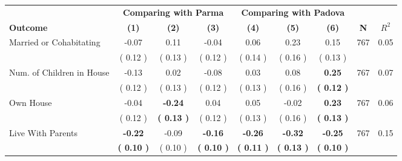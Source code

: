 \begin{tabular}{lcccccccc}
\toprule
 & \multicolumn{3}{c}{\textbf{Comparing with Parma}} & \multicolumn{3}{c}{\textbf{Comparing with Padova}} & \\
\cmidrule(lr){2-4} \cmidrule(lr){5-7} 
 \textbf{Outcome} & \textbf{(1)} & \textbf{(2)} & \textbf{(3)} & \textbf{(4)} & \textbf{(5)} & \textbf{(6)} & \textbf{N} & \textbf{$ R^2$} \\
\midrule
Married or Cohabitating &     -0.07 &      0.11 &     -0.04 &      0.06 &      0.23 &      0.15 & 767 &       0.05 \\ 
 & (     0.12 ) & (     0.13 ) & (     0.12 ) & (     0.14 ) & (     0.16 ) & (     0.13 ) & \\
Num. of Children in House &     -0.13 &      0.02 &     -0.08 &      0.03 &      0.08 & \textbf{     0.25} & 767 &       0.07 \\ 
 & (     0.12 ) & (     0.13 ) & (     0.12 ) & (     0.13 ) & (     0.16 ) & \textbf{(     0.12 )} & \\
Own House &     -0.04 & \textbf{    -0.24} &      0.04 &      0.05 &     -0.02 & \textbf{     0.23} & 767 &       0.06 \\ 
 & (     0.12 ) & \textbf{(     0.13 )} & (     0.12 ) & (     0.13 ) & (     0.16 ) & \textbf{(     0.13 )} & \\
Live With Parents & \textbf{    -0.22} &     -0.09 & \textbf{    -0.16} & \textbf{    -0.26} & \textbf{    -0.32} & \textbf{    -0.25} & 767 &       0.15 \\ 
 & \textbf{(     0.10 )} & (     0.10 ) & \textbf{(     0.10 )} & \textbf{(     0.11 )} & \textbf{(     0.13 )} & \textbf{(     0.10 )} & \\
\bottomrule
\end{tabular}
